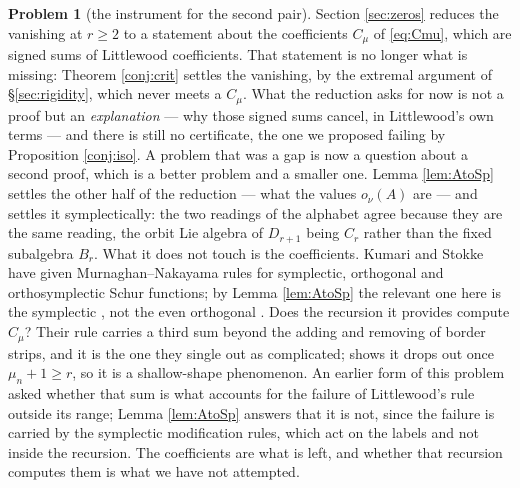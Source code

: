 \documentclass[11pt,reqno]{amsart}
\theoremstyle{plain}
\theoremstyle{definition}
\newtheorem{problem}[theorem]{Problem}
\begin{document}
\begin{problem}[the instrument for the second pair]\label{prob:instrument}
Section \ref{sec:zeros} reduces the vanishing at $r\ge2$ to a statement about the coefficients
$C_\mu$ of \eqref{eq:Cmu}, which are signed sums of Littlewood coefficients. That statement is no
longer what is missing: Theorem \ref{conj:crit} settles the vanishing, by the extremal argument of
\S\ref{sec:rigidity}, which never meets a $C_\mu$. What the reduction asks for now is not a proof
but an \emph{explanation} --- why those signed sums cancel, in Littlewood's own terms --- and there
is still no certificate, the one we proposed failing by Proposition \ref{conj:iso}. A problem that
was a gap is now a question about a second proof, which is a better problem and a smaller one. Lemma \ref{lem:AtoSp} settles the other half of the reduction --- what
the values $o_\nu(A)$ are --- and settles it symplectically: the two readings of the alphabet agree
because they are the same reading, the orbit Lie algebra of $D_{r+1}$ being $C_r$ rather than the
fixed subalgebra $B_r$. What it does not touch is the coefficients. Kumari and Stokke \cite{KS26}
have given Murnaghan--Nakayama rules for symplectic, orthogonal and orthosymplectic Schur functions;
by Lemma \ref{lem:AtoSp} the relevant one here is the symplectic \cite[Theorem 3.4]{KS26}, not the
even orthogonal \cite[Theorem 3.10]{KS26}. Does the recursion it provides compute $C_\mu$? Their rule
carries a third sum beyond the adding and removing of border strips, and it is the one they single out
as complicated; \cite[Corollary 3.5]{KS26} shows it drops out once $\mu_n+1\ge r$, so it is a
shallow-shape phenomenon. An earlier form of this problem asked whether that sum is what accounts for
the failure of Littlewood's rule outside its range; Lemma \ref{lem:AtoSp} answers that it is not,
since the failure is carried by the symplectic modification rules, which act on the labels and not
inside the recursion. The coefficients are what is left, and whether that recursion computes them is
what we have not attempted.


\end{problem}
\end{document}
